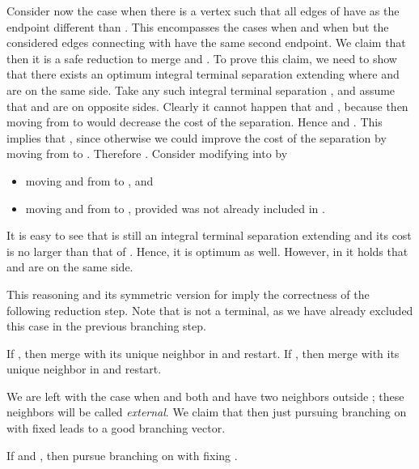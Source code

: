 Consider now the case when there is a vertex  such that all edges of  have  as the endpoint different than . This encompasses the cases when  and when  but the considered edges connecting  with  have the same second endpoint. We claim that then it is a safe reduction to merge  and . To prove this claim, we need to show that there exists an optimum integral terminal separation  extending  where  and  are on the same side. Take any such integral terminal separation , and assume that  and  are on opposite sides. Clearly it cannot happen that  and , because then moving  from  to  would decrease the cost of the separation. Hence  and . This implies that , since otherwise we could improve the cost of the separation by moving  from  to . Therefore . Consider modifying  into  by 
\begin{itemize}
\item moving  and  from  to , and
\item moving  and  from  to , provided  was not already included in .
\end{itemize}
It is easy to see that  is still an integral terminal separation extending  and its cost is no larger than that of . Hence, it is optimum as well. However, in  it holds that  and  are on the same side.

This reasoning and its symmetric version for  imply the correctness of the following reduction step.
Note that  is not a terminal, as we have already excluded this case in the previous branching step.

\begin{reductionstep}
If , then merge  with its unique neighbor in  and restart. If , then merge  with its unique neighbor in  and restart.
\end{reductionstep}

We are left with the case when  and both  and  have two neighbors outside ; these neighbors will be called {\em{external}}. We claim that then just pursuing branching on  with fixed  leads to a good branching vector.

\begin{branching}
If  and , then pursue branching on  with fixing .
\end{branching}

